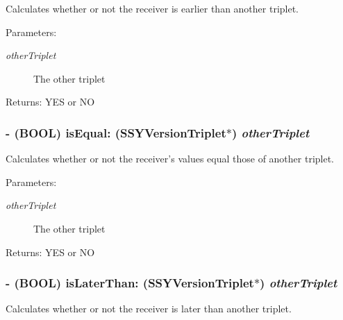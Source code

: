 Calculates whether or not the receiver is earlier than another triplet. 

\begin{Desc}
\item[Parameters:]
\begin{description}
\item[{\em otherTriplet}]The other triplet \end{description}
\end{Desc}
\begin{Desc}
\item[Returns:]YES or NO \end{Desc}
\hypertarget{interface_s_s_y_version_triplet_0a4119de6b3e3335fe39bba2eb1479a2}{
\subsubsection[{isEqual:}]{\setlength{\rightskip}{0pt plus 5cm}- (BOOL) isEqual: ({\bf SSYVersionTriplet}$\ast$) {\em otherTriplet}}}
\label{interface_s_s_y_version_triplet_0a4119de6b3e3335fe39bba2eb1479a2}


Calculates whether or not the receiver's values equal those of another triplet. 

\begin{Desc}
\item[Parameters:]
\begin{description}
\item[{\em otherTriplet}]The other triplet \end{description}
\end{Desc}
\begin{Desc}
\item[Returns:]YES or NO \end{Desc}
\hypertarget{interface_s_s_y_version_triplet_2fb9009d066b8c8170f2afaec2b0fa33}{
\subsubsection[{isLaterThan:}]{\setlength{\rightskip}{0pt plus 5cm}- (BOOL) isLaterThan: ({\bf SSYVersionTriplet}$\ast$) {\em otherTriplet}}}
\label{interface_s_s_y_version_triplet_2fb9009d066b8c8170f2afaec2b0fa33}


Calculates whether or not the receiver is later than another triplet. 

